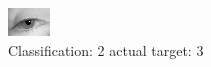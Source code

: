 \begin{figure}[h!]
\begin{center}
\includegraphics[width=0.60\columnwidth]{figures/ID2875_class_2_target_3.png}
\end{center}
\caption{ Classification: 2 actual target: 3}
\label{fig:ID2875_class_2_target_3}
\end{figure}
